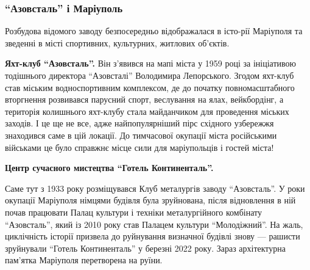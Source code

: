  
 
 
 
 

\subsubsection{\enquote{Азовсталь} і Маріуполь}

Розбудова відомого заводу безпосередньо відображалася в істо\hyp{}рії Маріуполя та
зведенні в місті спортивних, культурних, житлових об'єктів.

\textbf{\color{blue} Яхт-клуб \enquote{Азовсталь}.} Він з'явився на мапі міста у 1959 році за ініціативою
тодішнього директора \enquote{Азовсталі} Володимира Лепорського. Згодом яхт-клуб став
міським водноспортивним комплексом, де до початку повномасштабного вторгнення
розвивався парусний спорт, веслування на ялах, вейкбордінг, а територія
колишнього яхт-клубу стала майданчиком для проведення міських заходів. І це ще
не все, адже найпопулярніший пірс східного узбережжя знаходився саме в цій
локації. До тимчасової окупації міста російськими військами це було справжнє
місце сили для маріупольців і гостей міста!

\textbf{\color{blue} Центр сучасного мистецтва \enquote{Готель Континенталь}.} 

Саме тут з 1933 року розміщувався Клуб металургів заводу \enquote{Азовсталь}. У роки
окупації Маріуполя німцями будівля була зруйнована, після відновлення в ній
почав працювати Палац культури і техніки металургійного комбінату \enquote{Азовсталь},
який із 2010 року став Палацем культури \enquote{Молодіжний}. На жаль, циклічність
історії призвела до руйнування визначної будівлі знову — рашисти зруйнували
\enquote{Готель Континенталь} у березні 2022 року. Зараз архітектурна пам’ятка
Маріуполя перетворена на руїни.


